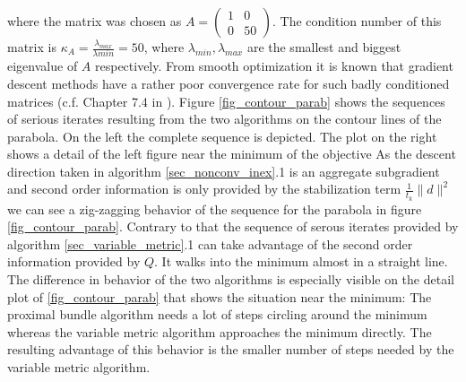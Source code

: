 where the matrix was chosen as \(A = \begin{pmatrix} 1&0 \\ 0&50\end{pmatrix}\). The condition number of this matrix is \(\kappa_A = \frac{\lambda_{max}}{\lambda{min}} = 50\), where \(\lambda_{min}, \lambda_{max}\) are the smallest and biggest eigenvalue of \(A\) respectively. From smooth optimization it is known that gradient descent methods have a rather poor convergence rate for such badly conditioned matrices (c.f. Chapter 7.4 in \cite{Ulbrich2012}).
Figure \ref{fig_contour_parab} shows the sequences of serious iterates resulting from the two algorithms on the contour lines of the parabola. On the left the complete sequence is depicted. The plot on the right shows a detail of the left figure near the minimum of the objective
As the descent direction taken in algorithm \ref{sec_nonconv_inex}.1 is an aggregate subgradient and second order information is only provided by the stabilization term \(\frac{1}{t_k}\|d\|^2\) we can see a zig-zagging behavior of the sequence for the parabola in figure \ref{fig_contour_parab}.
Contrary to that the sequence of serous iterates provided by algorithm \ref{sec_variable_metric}.1 can take advantage of the second order information provided by \(Q\).
It walks into the minimum almost in a straight line. The difference in behavior of the two algorithms is especially visible on the detail plot of \ref{fig_contour_parab} that shows the situation near the minimum: The proximal bundle algorithm needs a lot of steps circling around the minimum whereas the variable metric algorithm approaches the minimum directly. The resulting advantage of this behavior is the smaller number of steps needed by the variable metric algorithm. 



